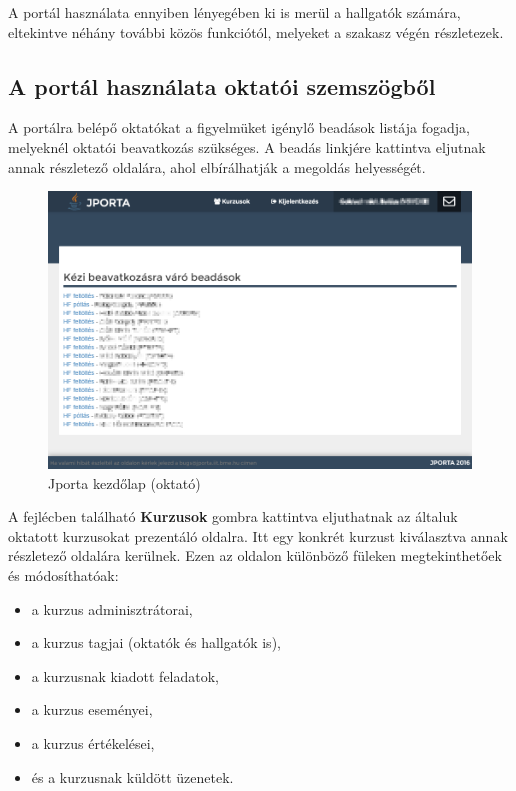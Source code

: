 A portál használata ennyiben lényegében ki is merül a hallgatók számára, eltekintve néhány további közös funkciótól, melyeket a szakasz végén részletezek.

\subsection{A portál használata oktatói szemszögből}
A portálra belépő oktatókat a figyelmüket igénylő beadások listája fogadja, melyeknél oktatói beavatkozás szükséges.
A beadás linkjére kattintva eljutnak annak részletező oldalára, ahol elbírálhatják a megoldás helyességét.
\begin{figure}[h]
    \centering
    \includegraphics[width=\textwidth]{figures/Jporta-home-o}
    \caption{Jporta kezdőlap (oktató)}
    \label{figure:jporta-home-o}
\end{figure}

A fejlécben található \textbf{Kurzusok} gombra kattintva eljuthatnak az általuk oktatott kurzusokat prezentáló oldalra.
Itt egy konkrét kurzust kiválasztva annak részletező oldalára kerülnek.
Ezen az oldalon különböző füleken megtekinthetőek és módosíthatóak:
\begin{itemize}
    \item a kurzus adminisztrátorai,
    \item a kurzus tagjai (oktatók és hallgatók is),
    \item a kurzusnak kiadott feladatok,
    \item a kurzus eseményei,
    \item a kurzus értékelései,
    \item és a kurzusnak küldött üzenetek.
\end{itemize}

